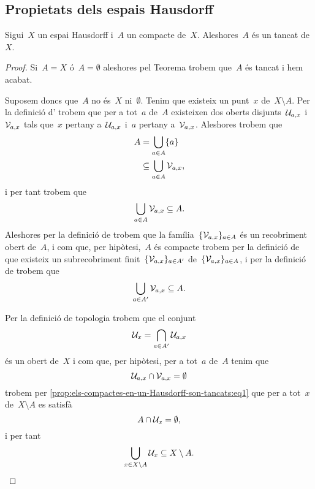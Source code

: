 \documentclass[../../main.tex]{subfiles}
\begin{document}
    \subsection{Propietats dels espais Hausdorff}
    \begin{proposition}
        \label{prop:els-compactes-en-un-Hausdorff-son-tancats}
        Sigui~\(X\) un espai Hausdorff i~\(A\) un compacte de~\(X\).
        Aleshores~\(A\) és un tancat de~\(X\).
    \end{proposition}
    \begin{proof} %
        Si~\(A=X\) ó~\(A=\emptyset\) aleshores pel Teorema  trobem que~\(A\) és tancat i hem acabat.

        Suposem doncs que~\(A\) no és~\(X\) ni~\(\emptyset\).
        Tenim que existeix un punt~\(x\) de~\(X\setminus A\).
        Per la definició d' trobem que per a tot~\(a\) de~\(A\) existeixen dos oberts disjunts~\(\mathcal{U}_{a,x}\) i~\(\mathcal{V}_{a,x}\) tals que~\(x\) pertany a~\(\mathcal{U}_{a,x}\) i~\(a\) pertany a~\(\mathcal{V}_{a,x}\).
        Aleshores trobem que
        \begin{align*}
            A&=\bigcup_{a\in A}\{a\} \\
            &\subseteq\bigcup_{a\in A}\mathcal{V}_{a,x},
        \end{align*}
        i per tant trobem que
        \[
            \bigcup_{a\in A}\mathcal{V}_{a,x}\subseteq A.
        \]
        Aleshores per la definició de  trobem que la família~\(\{\mathcal{V}_{a,x}\}_{a\in A}\) és un recobriment obert de~\(A\), i com que, per hipòtesi,~\(A\) és compacte trobem per la definició de  que existeix un subrecobriment finit~\(\{\mathcal{V}_{a,x}\}_{a\in A'}\) de~\(\{\mathcal{V}_{a,x}\}_{a\in A}\), i per la definició de  trobem que
        \begin{equation}
            \label{prop:els-compactes-en-un-Hausdorff-son-tancats:eq1}
            \bigcup_{a\in A'}\mathcal{V}_{a,x}\subseteq A.
        \end{equation}

        Per la definició de topologia trobem que el conjunt
        \[
            \mathcal{U}_{x}=\bigcap_{a\in A'}\mathcal{U}_{a,x}
        \]
        és un obert de~\(X\) i com que, per hipòtesi, per a tot~\(a\) de~\(A\) tenim que
        \[
            \mathcal{U}_{a,x}\cap\mathcal{V}_{a,x}=\emptyset
        \]
        trobem per \eqref{prop:els-compactes-en-un-Hausdorff-son-tancats:eq1} que per a tot~\(x\) de~\(X\setminus A\) es satisfà
        \[
            A\cap\mathcal{U}_{x}=\emptyset,
        \]
        i per tant
        \[
            \bigcup_{x\in X\setminus A}\mathcal{U}_{x}\subseteq X\setminus A.
        \]


\end{proof}
\end{document}
